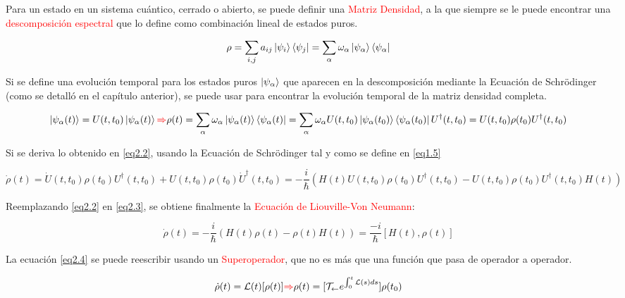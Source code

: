 \documentclass{book}
\begin{document}
Para un estado en un sistema cuántico, cerrado o abierto, se puede definir una \textcolor{red}{Matriz Densidad}, a la que siempre se le puede encontrar una \textcolor{red}{descomposición espectral} que lo define como combinación lineal de estados puros.

\begin{equation}\label{eq2.1}\rho=\sum_{i,j}a_{ij}\ket{\psi_i}\bra{\psi_j}=\sum_\alpha \omega_\alpha \ket{\psi_\alpha}\bra{\psi_\alpha}\end{equation}

Si se define una evolución temporal para los estados puros $\ket{\psi_\alpha}$ que aparecen en la descomposición mediante la Ecuación de Schr\"odinger (como se detalló en el capítulo anterior), se puede usar para encontrar la evolución temporal de la matriz densidad completa.

\begin{equation}\label{eq2.2}\ket{\psi_\alpha(t)}=U(t,t_0)\ket{\psi_\alpha(t)}\textcolor{red}{\Rightarrow} \rho(t)=\sum_\alpha \omega_\alpha \ket{\psi_\alpha(t)}\bra{\psi_\alpha(t)}=\sum_\alpha \omega_\alpha U(t,t_0)\ket{\psi_\alpha(t_0)}\bra{\psi_\alpha(t_0)}U^\dag(t,t_0)=U(t,t_0)\rho(t_0)U^\dag(t,t_0)\end{equation}

Si se deriva lo obtenido en \ref{eq2.2}, usando la Ecuación de Schr\"odinger tal y como se define en \ref{eq1.5}

\begin{equation}\label{eq2.3}\dot{\rho}(t)=\dot{U}(t,t_0)\rho(t_0)U^\dag(t,t_0)+U(t,t_0)\rho(t_0)\dot{U}^\dag(t,t_0)=-\frac{i}{\hslash}(H(t)U(t,t_0)\rho(t_0)U^\dag(t,t_0)-U(t,t_0)\rho(t_0)U^\dag(t,t_0)H(t))\end{equation}

Reemplazando \ref{eq2.2} en \ref{eq2.3}, se obtiene finalmente la \textcolor{red}{Ecuación de Liouville-Von Neumann}:

\begin{equation}\label{eq2.4}\dot{\rho}(t)=-\frac{i}{\hslash}(H(t)\rho(t)-\rho(t)H(t))=\frac{-i}{\hslash}[H(t),\rho(t)]\end{equation}

La ecuación \ref{eq2.4} se puede reescribir usando un \textcolor{red}{Superoperador}, que no es más que una función que pasa de operador a operador.

\begin{equation}\label{eq2.5}\dot{\rho}(t)=\mathcal{L}(t)[\rho(t)]\textcolor{red}{\Rightarrow} \rho(t)=[\mathcal{T}_{\leftarrow} e^{\int_0^t \mathcal{L}(s) ds}]\rho(t_0)\end{equation}
\end{document}
